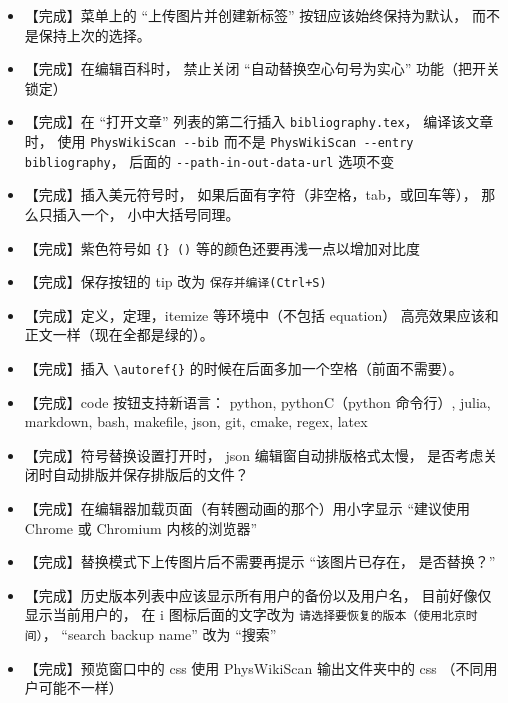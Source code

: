 \begin{itemize}
\item 【完成】菜单上的 “上传图片并创建新标签” 按钮应该始终保持为默认， 而不是保持上次的选择。

\item 【完成】在编辑百科时， 禁止关闭 “自动替换空心句号为实心” 功能（把开关锁定）

\item 【完成】在 “打开文章” 列表的第二行插入 \verb`bibliography.tex`， 编译该文章时， 使用 \verb`PhysWikiScan --bib` 而不是 \verb`PhysWikiScan --entry bibliography`， 后面的 \verb`--path-in-out-data-url` 选项不变

\item 【完成】插入美元符号时， 如果后面有字符（非空格，tab，或回车等）， 那么只插入一个， 小中大括号同理。

\item 【完成】紫色符号如 \verb`{} ()`  等的颜色还要再浅一点以增加对比度

\item 【完成】保存按钮的 tip 改为 \verb`保存并编译(Ctrl+S)`

\item 【完成】定义，定理，itemize 等环境中（不包括 equation） 高亮效果应该和正文一样（现在全都是绿的）。

\item 【完成】插入 \verb`\autoref{}` 的时候在后面多加一个空格（前面不需要）。

\item 【完成】code 按钮支持新语言： python, pythonC（python 命令行）, julia, markdown, bash, makefile, json, git, cmake, regex, latex

\item 【完成】符号替换设置打开时， json 编辑窗自动排版格式太慢， 是否考虑关闭时自动排版并保存排版后的文件？

\item 【完成】在编辑器加载页面（有转圈动画的那个）用小字显示 “建议使用 Chrome 或 Chromium 内核的浏览器”

\item 【完成】替换模式下上传图片后不需要再提示 “该图片已存在， 是否替换？”

\item 【完成】历史版本列表中应该显示所有用户的备份以及用户名， 目前好像仅显示当前用户的， 在 i 图标后面的文字改为 \verb`请选择要恢复的版本（使用北京时间）`， “search backup name”  改为 “搜索”

\item 【完成】预览窗口中的 css 使用 PhysWikiScan 输出文件夹中的 css （不同用户可能不一样）


\end{itemize}
